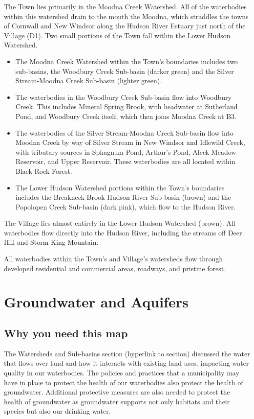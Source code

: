 The Town lies primarily in the Moodna Creek Watershed. All of the waterbodies 
within this watershed drain to the mouth the Moodna, which straddles the towns 
of Cornwall and New Windsor along the Hudson River Estuary just north of the 
Village (D1). Two small portions of the Town fall within the Lower Hudson 
Watershed.
\begin{itemize}
  \item The Moodna Creek Watershed within the Town's boundaries includes two 
    sub-basins, the Woodbury Creek Sub-basin (darker green) and the 
    Silver Stream-Moodna Creek Sub-basin (lighter green).
  \item The waterbodies in the Woodbury Creek Sub-basin flow into Woodbury 
    Creek. This includes Mineral Spring Brook, with headwater at Sutherland 
    Pond, and Woodbury Creek itself, which then joins Moodna Creek at B3.
  \item The waterbodies of the Silver Stream-Moodna Creek Sub-basin flow 
    into Moodna Creek by way of Silver Stream in New Windsor and Idlewild 
    Creek, with tributary sources in Sphagnum Pond, Arthur’s Pond, Aleck Meadow 
    Reservoir, and Upper Reservoir. These waterbodies are all located within 
    Black Rock Forest.
  \item The Lower Hudson Watershed portions within the Town's boundaries 
    includes the Breakneck Brook-Hudson River Sub-basin (brown) and the 
    Popolopen Creek Sub-basin (dark pink), which flow to the Hudson River.
\end{itemize}
The Village lies almost entirely in the Lower Hudson Watershed (brown). All 
waterbodies flow directly into the Hudson River, including the streams off Deer 
Hill and Storm King Mountain.

All waterbodies within the Town’s and Village’s watersheds flow through 
developed residential and commercial areas, roadways, and pristine forest.

\label{map:watershedsandsubbasins}

\section{Groundwater and Aquifers}\label{subsec:groundwater}
\subsection*{Why you need this map}
The Watersheds and Sub-basins section (hyperlink to section) discussed the 
water that flows over land and how it interacts with existing land uses, 
impacting water quality in our waterbodies. The policies and practices that a 
municipality may have in place to protect the health of our waterbodies also 
protect the health of groundwater. Additional protective measures are also 
needed to protect the health of groundwater as groundwater supports not only 
habitats and their species but also our drinking water.

